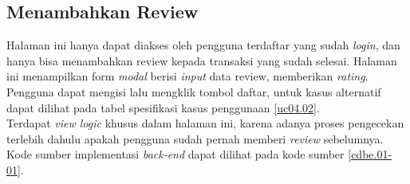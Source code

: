 \subsection{Menambahkan Review}
    Halaman ini hanya dapat diakses oleh pengguna terdaftar yang sudah \textit{login}, dan hanya bisa menambahkan review kepada transaksi yang sudah selesai. Halaman ini menampilkan form \textit{modal} berisi \textit{input} data review, memberikan \textit{rating}. Pengguna dapat mengisi lalu mengklik tombol daftar, untuk kasus alternatif dapat dilihat pada tabel spesifikasi kasus penggunaan \ref{uc04.02}.\\
	\indent Terdapat \textit{view logic} khusus dalam halaman ini, karena adanya proses pengecekan terlebih dahulu apakah pengguna sudah pernah memberi \textit{review} sebelumnya. Kode sumber implementasi \textit{back-end} dapat dilihat pada kode sumber \ref{cdbe.01-01}.

	
